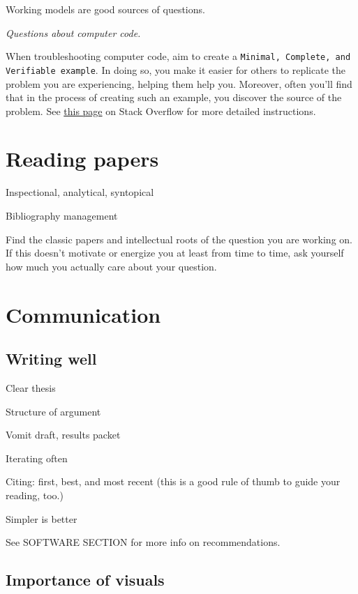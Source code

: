 \documentclass{tufte-book}
\newcommand{\doccls}[1]{\texttt{#1}}%
\begin{document}
Working models are good sources of questions.

{\it Questions about computer code.} 

When troubleshooting computer code, aim to create a \doccls{Minimal,
  Complete, and Verifiable example}. In doing so, you make it easier
for others to replicate the problem you are experiencing, helping them
help you. Moreover, often you'll find that in the process of creating
such an example, you discover the source of the problem. See
\href{https://stackoverflow.com/help/mcve}{this page} on Stack
Overflow for more detailed
instructions.


\section{Reading papers}

Inspectional, analytical, syntopical

Bibliography management

Find the classic papers and intellectual roots of the question you are
working on. If this doesn't motivate or energize you at least from
time to time, ask yourself how much you actually care about your question.

\section{Communication}

\subsection{Writing well}

Clear thesis

Structure of argument

Vomit draft, results packet

Iterating often

Citing: first, best, and most recent (this is a good rule of thumb to
guide your reading, too.)

Simpler is better

See SOFTWARE SECTION for more info on recommendations.

\subsection{Importance of visuals}
\end{document}
